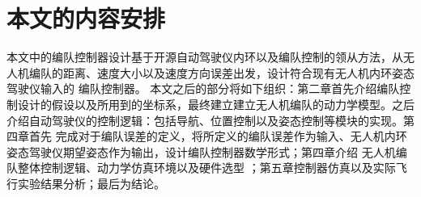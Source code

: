 \section{本文的内容安排}
本文中的编队控制器设计基于开源自动驾驶仪内环以及编队控制的领从方法，从无人机编队的距离、速度大小以及速度方向误差出发，设计符合现有无人机内环姿态驾驶仪输入的
编队控制器。
本文之后的部分将如下组织：第二章首先介绍编队控制设计的假设以及所用到的坐标系，最终建立建立无人机编队的动力学模型。之后介绍自动驾驶仪的控制逻辑：包括导航、位置控制以及姿态控制等模块的实现。第四章首先
完成对于编队误差的定义，将所定义的编队误差作为输入、无人机内环姿态驾驶仪期望姿态作为输出，设计编队控制器数学形式；第四章介绍
无人机编队整体控制逻辑、动力学仿真环境以及硬件选型 ；第五章控制器仿真以及实际飞行实验结果分析；最后为结论。
